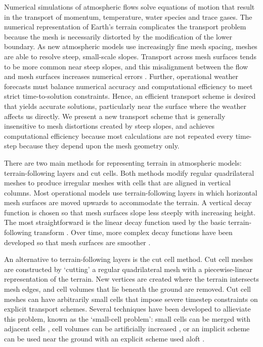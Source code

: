Numerical simulations of atmospheric flows solve equations of motion that result in the transport of momentum, temperature, water species and trace gases.  The numerical representation of Earth's terrain complicates the transport problem because the mesh is necessarily distorted by the modification of the lower boundary.
As new atmospheric models use increasingly fine mesh spacing, meshes are able to resolve steep, small-scale slopes.  Transport across mesh surfaces tends to be more common near steep slopes, and this misalignment between the flow and mesh surfaces increases numerical errors \citep{schaer2002,shaw-weller2016}.
Further, operational weather forecasts must balance numerical accuracy and computational efficiency to meet strict time-to-solution constraints.  Hence, an efficient transport scheme is desired that yields accurate solutions, particularly near the surface where the weather affects us directly.
We present a new transport scheme that is generally insensitive to mesh distortions created by steep slopes, and achieves computational efficiency because most calculations are not repeated every time-step because they depend upon the mesh geometry only.

There are two main methods for representing terrain in atmospheric models: terrain-following layers and cut cells.  Both methods modify regular quadrilateral meshes to produce irregular meshes with cells that are aligned in vertical columns.  Most operational models use terrain-following layers in which horizontal mesh surfaces are moved upwards to accommodate the terrain.  A vertical decay function is chosen so that mesh surfaces slope less steeply with increasing height.
The most straightforward is the linear decay function used by the basic terrain-following transform \citep{galchen-somerville1975}.  Over time, more complex decay functions have been developed so that mesh surfaces are smoother \citep{simmons-burridge1981,schaer2002,leuenberger2010,klemp2011}.

An alternative to terrain-following layers is the cut cell method.  Cut cell meshes are constructed by `cutting' a regular quadrilateral mesh with a piecewise-linear representation of the terrain.  New vertices are created where the terrain intersects mesh edges, and cell volumes that lie beneath the ground are removed.  Cut cell meshes can have arbitrarily small cells that impose severe timestep constraints on explicit transport schemes.  Several techniques have been developed to allieviate this problem, known as the `small-cell problem': small cells can be merged with adjacent cells \citep{yamazaki2016}, cell volumes can be artificially increased \citep{steppeler2002}, or an implicit scheme can be used near the ground with an explicit scheme used aloft \citep{jebens2011}.

